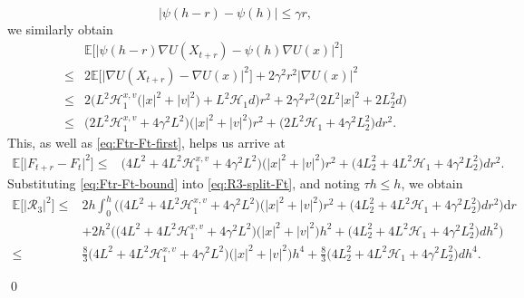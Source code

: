 \documentclass[12pt]{article}
\numberwithin{equation}{section}
\renewenvironment{proof}%
  {\begin{trivlist}%
   \item[]\ignorespaces}%
  {\qed\end{trivlist}}
\newcommand{\dd}{\mathrm{d}}
\begin{document}
\begin{proof}
\[
|\psi(h-r)-\psi(h)|
\leq
\gamma r,
\]
we similarly obtain
\begin{equation}
\label{eq:Ftr-Ft-second}
\begin{aligned}
&
\mathbb E
\Big[
\big|
\psi(h-r)\nabla U(X_{t+r})
-
\psi(h)\nabla U(x)
\big|^2
\Big]
\\
\leq&
2
\mathbb E
\Big[
\big|
\nabla U(X_{t+r})-\nabla U(x)
\big|^2
\Big]
+
2\gamma^2r^2|\nabla U(x)|^2
\\
\leq&
2
\Big(
L^2\mathscr H^{x,v}_1
\big(
|x|^2+|v|^2
\big)
+
L^2\mathscr H_1d
\Big)r^2
+
2\gamma^2r^2
\big(
2L^2|x|^2+2L_2^2d
\big)
\\
\leq&
\Big(
2L^2\mathscr H^{x,v}_1
+
4\gamma^2L^2
\Big)
\big(
|x|^2+|v|^2
\big)r^2
+
\Big(
2L^2\mathscr H_1
+
4\gamma^2L_2^2
\Big)dr^2 .
\end{aligned}
\end{equation}
This, as well as \eqref{eq:Ftr-Ft-first}, helps us arrive at
\begin{equation}
\label{eq:Ftr-Ft-bound}
\begin{aligned}
\mathbb E
\Big[
\big|
F_{t+r}-F_t
\big|^2
\Big]
\leq&
\Big(
4L^2
+
4L^2\mathscr H^{x,v}_1
+
4\gamma^2L^2
\Big)
\big(
|x|^2+|v|^2
\big)r^2
+
\Big(
4L_2^2
+
4L^2\mathscr H_1
+
4\gamma^2L_2^2
\Big)dr^2 .
\end{aligned}
\end{equation}
Substituting \eqref{eq:Ftr-Ft-bound} into \eqref{eq:R3-split-Ft}, and noting $\tau h\leq h$, we obtain
\begin{equation}
\label{eq:R3-one-step-refined-final}
\begin{aligned}
\mathbb E
\Big[\big|
\mathcal R_3
\big|^2\Big]
\leq&
2h
\int_0^h
\bigg(
\Big(
4L^2
+
4L^2\mathscr H^{x,v}_1
+
4\gamma^2L^2
\Big)
\big(
|x|^2+|v|^2
\big)r^2
+
\Big(
4L_2^2
+
4L^2\mathscr H_1
+
4\gamma^2L_2^2
\Big)dr^2
\bigg)\dd r
\\   & 
+
2h^2
\bigg(
\Big(
4L^2
+
4L^2\mathscr H^{x,v}_1
+
4\gamma^2L^2
\Big)
\big(
|x|^2+|v|^2
\big)h^2
+
\Big(
4L_2^2
+
4L^2\mathscr H_1
+
4\gamma^2L_2^2
\Big)dh^2
\bigg)
\\
\leq&
\tfrac{8}{3}
\Big(
4L^2
+
4L^2\mathscr H^{x,v}_1
+
4\gamma^2L^2
\Big)
\big(
|x|^2+|v|^2
\big)h^4
+
\tfrac{8}{3}
\Big(
4L_2^2
+
4L^2\mathscr H_1
+
4\gamma^2L_2^2
\Big)dh^4.
\end{aligned}
\end{equation}


\end{proof}
\end{document}
